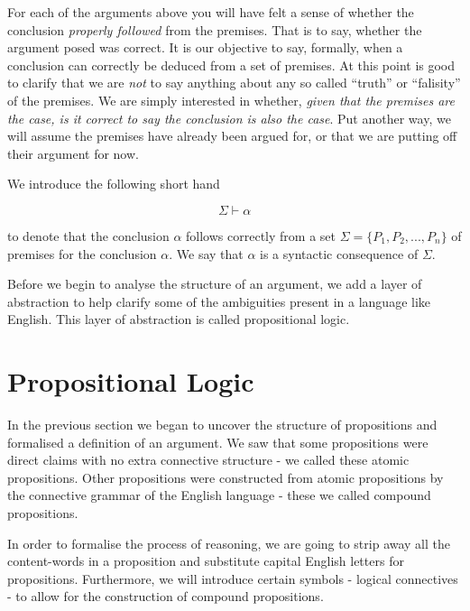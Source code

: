 \documentclass{book}
\begin{document}
For each of the arguments above you will have felt a sense of whether the conclusion \emph{properly followed} from the premises. That is to say, whether the argument posed was correct. It is our objective to say, formally, when a conclusion can correctly be deduced from a set of premises. At this point is good to clarify that we are \emph{not} to say anything about any so called ``truth'' or ``falisity'' of the premises. We are simply interested in whether, \emph{given that the premises are the case, is it correct to say the conclusion is also the case}. Put another way, we will assume the premises have already been argued for, or that we are putting off their argument for now. 


    We introduce the following short hand

    $$\Sigma \vdash \alpha$$ 

    to denote that the conclusion $\alpha$ follows correctly from a set $\Sigma = \{P_{1},P_{2},...,P_{n}\}$ of premises for the conclusion $\alpha$. We say that $\alpha$ is a syntactic consequence of $\Sigma$. 



Before we begin to analyse the structure of an argument, we add a layer of abstraction to help clarify some of the ambiguities present in a language like English. This layer of abstraction is called propositional logic. 


\section{Propositional Logic}


In the previous section we began to uncover the structure of propositions and formalised a definition of an argument. We saw that some propositions were direct claims with no extra connective structure - we called these atomic propositions. Other propositions were constructed from atomic propositions by the connective grammar of the English language - these we called compound propositions. 

In order to formalise the process of reasoning, we are going to strip away all the content-words in a proposition and substitute capital English letters for propositions. Furthermore, we will introduce certain symbols - logical connectives - to allow for the construction of compound propositions. 

\end{document}
